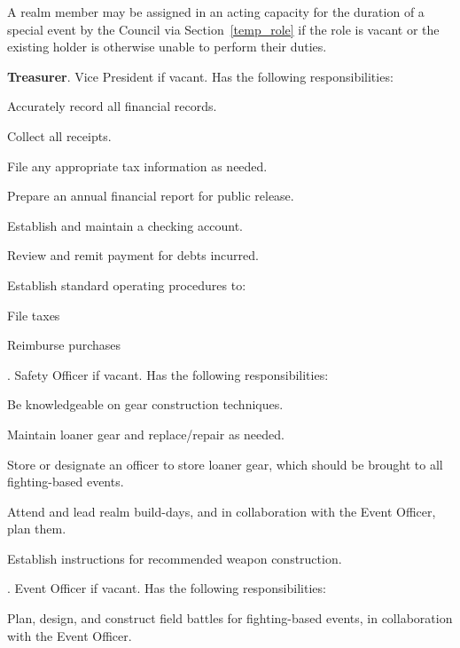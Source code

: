 \documentclass[12pt]{article}
\begin{document}
\begin{level}
\begin{level}
    \item A realm member may be assigned in an acting capacity for the duration of a special event by the Council via Section~\ref{temp_role} if the role is vacant or the existing holder is otherwise unable to perform their duties.
    \item \textbf{Treasurer}. Vice President if vacant. Has the following responsibilities:
    \begin{level}
        \item Accurately record all financial records.
        \item Collect all receipts.
        \item File any appropriate tax information as needed.
        \item Prepare an annual financial report for public release.
        \item Establish and maintain a checking account.
        \item Review and remit payment for debts incurred.
        \item Establish standard operating procedures to:
        \begin{level}
            \item File taxes
            \item Reimburse purchases
        \end{level}
    \end{level}
    \item {}. Safety Officer if vacant. Has the following responsibilities:
    \begin{level}
        \item Be knowledgeable on gear construction techniques.
        \item Maintain loaner gear and replace/repair as needed.
        \item Store or designate an officer to store loaner gear, which should be brought to all fighting-based events.
        \item Attend and lead realm build-days, and in collaboration with the Event Officer, plan them.
        \item Establish instructions for recommended weapon construction.
    \end{level}
    \item {}. Event Officer if vacant. Has the following responsibilities:
    \begin{level}
        \item Plan, design, and construct field battles for fighting-based events, in collaboration with the Event Officer.

\end{level}
\end{level}
\end{level}
\end{document}
